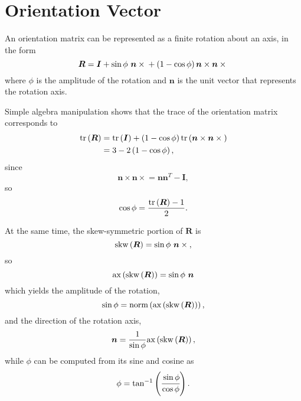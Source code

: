 \documentclass[10pt,dvips,fleqn,subeqn]{report}
\newcommand{\T}[1]{\boldsymbol{#1}}
\begin{document}
\section{Orientation Vector}
An orientation matrix can be represented as a finite rotation about 
an axis, in the form
\begin{equation}
	\T{R} = \T{I}
	+ \sin\phi \ \T{n}\times{}
	+ \plbr{1 - \cos\phi} \T{n}\times\T{n}\times{}
\end{equation}
where $\phi$ is the amplitude of the rotation and $\T{n}$ 
is the unit vector that represents the rotation axis.

Simple algebra manipulation shows that the trace of the orientation matrix
corresponds to 
\begin{align}
	\mathrm{tr}\plbr{\T{R}}
	&= \mathrm{tr}\plbr{\T{I}}
	+ \plbr{1 - \cos\phi}\mathrm{tr}\plbr{\T{n}\times\T{n}\times{}} \\
	&= 3 - 2 \plbr{1 - \cos\phi} ,
\end{align}
since
\begin{equation}
	\T{n}\times\T{n}\times{} = \T{n} \T{n}^T - \T{I} ,
\end{equation}
so
\begin{equation}
	\cos\phi = \frac{\mathrm{tr}\plbr{\T{R}} - 1}{2} .
\end{equation}

At the same time, the skew-symmetric portion of $\T{R}$ is
\begin{equation}
	\mathrm{skw}\plbr{\T{R}} = \sin\phi \ \T{n}\times{} ,
\end{equation}
so
\begin{equation}
	\mathrm{ax}\plbr{\mathrm{skw}\plbr{\T{R}}} = \sin\phi \ \T{n}
\end{equation}
which yields the amplitude of the rotation,
\begin{equation}
	\sin\phi
	= \mathrm{norm}\plbr{\mathrm{ax}\plbr{\mathrm{skw}\plbr{\T{R}}}} ,
\end{equation}
and the direction of the rotation axis,
\begin{equation}
	\T{n} = \frac{1}{\sin\phi}\mathrm{ax}\plbr{\mathrm{skw}\plbr{\T{R}}} ,
\end{equation}
while $\phi$ can be computed from its sine and cosine as
\begin{equation}
	\phi = \tan^{-1}\left( \cfrac{\sin\phi}{\cos\phi} \right) .
\end{equation}
\end{document}
